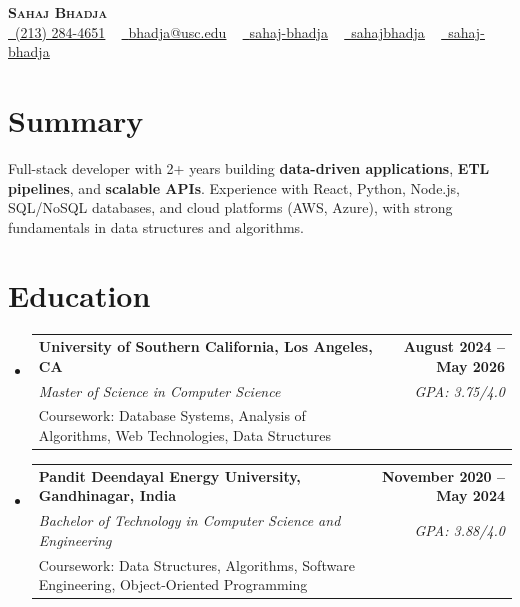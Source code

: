 \documentclass[letterpaper,10pt]{article}
\makeatletter
\newcommand{\resumeEduSubheading}[5]{\vspace{-1pt}\item\begin{tabular*}{1.0\textwidth}[t]{l@{\extracolsep{\fill}}r}\textbf{#1} & \textbf{\small #2} \\\textit{\small #3} & \textit{\small #4} \\\small #5 & \\\end{tabular*}\vspace{-4pt}}
\newcommand{\resumeSubHeadingListStart}{\begin{itemize}[leftmargin=0.0in, label={}]}
\newcommand{\resumeSubHeadingListEnd}{\end{itemize}}
\makeatother
\begin{document}
\begin{center}
{\Huge \scshape \textbf{Sahaj Bhadja}} \\ \vspace{1pt}
\small \href{tel:(213) 284-4651}{\faPhone\ \underline{(213) 284-4651}} ~ \href{mailto:bhadja@usc.edu}{\raisebox{-0.2\height}\faEnvelope\ \underline{bhadja@usc.edu}} ~
\href{https://www.linkedin.com/in/sahaj-bhadja/}{\raisebox{-0.2\height}\faLinkedin\ \underline{sahaj-bhadja}} ~ \href{https://github.com/SAHAJ-BHADJA}{\raisebox{-0.2\height}\faGithub\ \underline{sahajbhadja}} ~
\href{https://sahaj-bhadja.vercel.app/}{\raisebox{-0.2\height}\faGlobe\ \underline{sahaj-bhadja}}
\end{center}
\vspace{-18pt}
\section{Summary}
\begin{itemize}[leftmargin=0.15in, label={}]
\small{\item{Full-stack developer with 2+ years building \textbf{data-driven applications}, \textbf{ETL pipelines}, and \textbf{scalable APIs}. Experience with React, Python, Node.js, SQL/NoSQL databases, and cloud platforms (AWS, Azure), with strong fundamentals in data structures and algorithms.}}
\end{itemize}
\vspace{-16pt}
\section{Education}
\resumeSubHeadingListStart
\resumeEduSubheading{University of Southern California, Los Angeles, CA}{August 2024 -- May 2026}{Master of Science in Computer Science}{GPA: 3.75/4.0}{Coursework: Database Systems, Analysis of Algorithms, Web Technologies, Data Structures}
\vspace{-9pt}
\resumeEduSubheading{Pandit Deendayal Energy University, Gandhinagar, India}{November 2020 -- May 2024}{Bachelor of Technology in Computer Science and Engineering}{GPA: 3.88/4.0}{Coursework: Data Structures, Algorithms, Software Engineering, Object-Oriented Programming}
\resumeSubHeadingListEnd
\vspace{-14pt}
\end{document}
